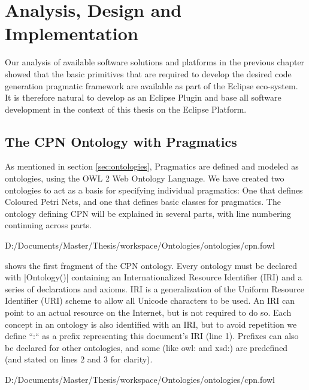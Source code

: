\chapter{Analysis, Design and Implementation}
\label{chap:analysis}

Our analysis of available software solutions and platforms in the previous
chapter showed that the basic primitives that are required to develop the
desired code generation pragmatic framework are available as part of the
Eclipse eco-system. It is therefore natural to develop \thename{} as an Eclipse Plugin
and base all software development in the context of this thesis on the Eclipse
Platform.

\section{The CPN Ontology with Pragmatics}

As mentioned in section \ref{sec:ontologies}, Pragmatics are defined and modeled
as ontologies, using the OWL 2 Web Ontology Language. We have created two
ontologies to act as a basis for specifying individual pragmatics:
One that defines Coloured Petri Nets, and one that defines basic classes for pragmatics.
The ontology defining CPN will be explained in several parts, with line
numbering continuing across parts.


{D:/Documents/Master/Thesis/workspace/Ontologies/ontologies/cpn.fowl}

 shows the first fragment of the CPN ontology. Every
ontology must be declared with |Ontology()| containing an Internationalized Resource
Identifier (IRI) and a series of declarations and axioms. IRI is a
generalization of the Uniform Resource Identifier (URI) scheme to allow all
Unicode characters to be used. An IRI can point to an actual resource on the Internet,
but is not required to do so. Each concept in an ontology is also identified
with an IRI, but to avoid repetition we define ``:`` as a prefix representing
this document's IRI (line 1). Prefixes can also be declared for other
ontologies, and some (like owl: and xsd:) are predefined (and stated on lines 2
and 3 for clarity). 


{D:/Documents/Master/Thesis/workspace/Ontologies/ontologies/cpn.fowl} 

